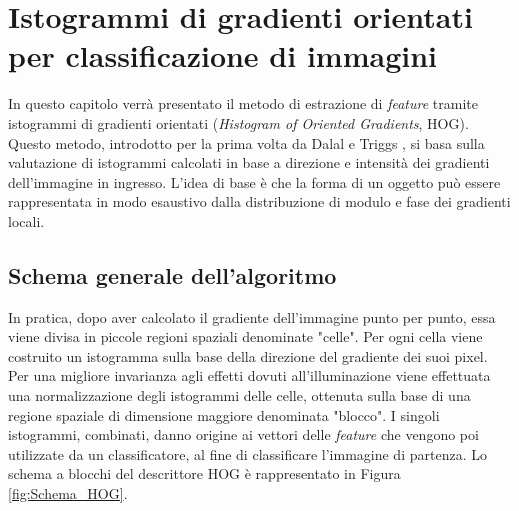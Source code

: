 
\chapter{Istogrammi di gradienti orientati per classificazione di immagini} %
\label{cap:hog}

In questo capitolo verrà presentato il metodo di estrazione di \emph{feature} tramite istogrammi di gradienti orientati (\emph{Histogram of Oriented Gradients}, HOG). Questo metodo, introdotto per la prima volta da Dalal e Triggs \citep{Art_HOGHuman}, si basa sulla valutazione di istogrammi calcolati in base a direzione e intensità dei gradienti dell'immagine in ingresso. L'idea di base è che la forma di un oggetto può essere rappresentata in modo esaustivo dalla distribuzione di modulo e fase dei gradienti locali. 
\clearpage

\section{Schema generale dell'algoritmo}
In pratica, dopo aver calcolato il gradiente dell'immagine punto per punto, essa viene divisa in piccole regioni spaziali denominate "celle". Per ogni cella viene costruito un istogramma sulla base della direzione del gradiente dei suoi pixel. Per una migliore invarianza agli effetti dovuti all'illuminazione viene effettuata una normalizzazione degli istogrammi delle celle, ottenuta sulla base di una regione spaziale di dimensione maggiore denominata "blocco". I singoli istogrammi, combinati, danno origine ai vettori delle \emph{feature} che vengono poi utilizzate da un classificatore, al fine di classificare l'immagine di partenza. Lo schema a blocchi del descrittore HOG è rappresentato in Figura \ref{fig:Schema_HOG}.
 \\

